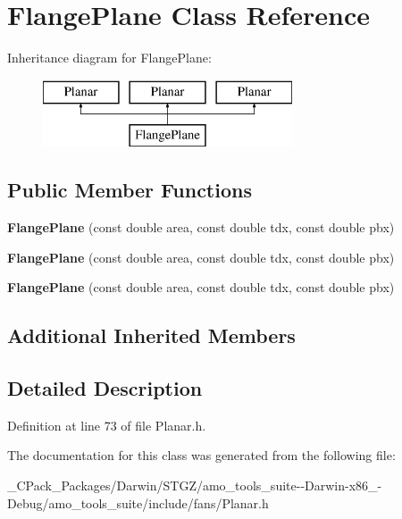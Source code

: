 \hypertarget{class_flange_plane}{}\section{Flange\+Plane Class Reference}
\label{class_flange_plane}
Inheritance diagram for Flange\+Plane\+:\begin{figure}[H]
\begin{center}
\leavevmode
\includegraphics[height=2.000000cm]{d0/de9/class_flange_plane}
\end{center}
\end{figure}
\subsection*{Public Member Functions}
\begin{DoxyCompactItemize}
\item 
\mbox{\label{class_flange_plane_a124814f4e579d4e0b415190e144147e6}} 
{\bfseries Flange\+Plane} (const double area, const double tdx, const double pbx)
\item 
\mbox{\label{class_flange_plane_a124814f4e579d4e0b415190e144147e6}} 
{\bfseries Flange\+Plane} (const double area, const double tdx, const double pbx)
\item 
\mbox{\label{class_flange_plane_a124814f4e579d4e0b415190e144147e6}} 
{\bfseries Flange\+Plane} (const double area, const double tdx, const double pbx)
\end{DoxyCompactItemize}
\subsection*{Additional Inherited Members}


\subsection{Detailed Description}


Definition at line 73 of file Planar.\+h.



The documentation for this class was generated from the following file\+:\begin{DoxyCompactItemize}
\item 
\+\_\+\+C\+Pack\+\_\+\+Packages/\+Darwin/\+S\+T\+G\+Z/amo\+\_\+tools\+\_\+suite-\/-\/\+Darwin-\/x86\+\_-\/\+Debug/amo\+\_\+tools\+\_\+suite/include/fans/Planar.\+h\end{DoxyCompactItemize}
